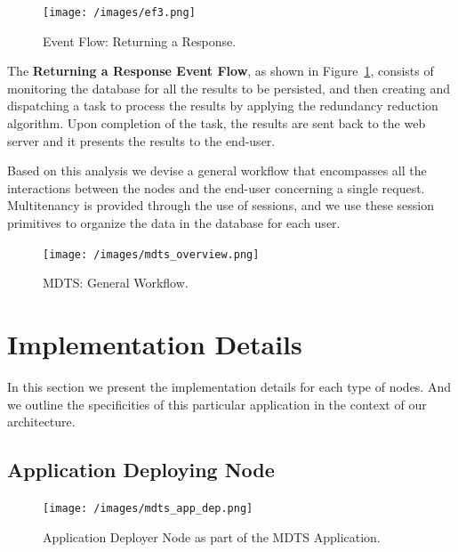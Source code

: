 \documentclass[12pt, titlepage]{uo_temp}
\begin{document}
     \begin{figure}
       \texttt{[image: /images/ef3.png]}
       \caption{Event Flow: Returning a Response.}
       \label{ef3}
     \end{figure}
     
     The \textbf{Returning a Response Event Flow}, as shown in Figure~\ref{ef3}, consists
     of monitoring the database for all the results to be persisted, and then creating and
     dispatching a task to process the results by applying the redundancy reduction
     algorithm. Upon completion of the task, the results are sent back to the web server
     and it presents the results to the end-user.
     
     Based on this analysis we devise a general workflow that encompasses all the
     interactions between the nodes and the end-user concerning a single
     request. Multitenancy is provided through the use of sessions, and we use these
     session primitives to organize the data in the database for each user.
     
     \begin{figure}
       \texttt{[image: /images/mdts\_overview.png]}
       \caption{MDTS: General Workflow.}
     \end{figure}

     
     \section{Implementation Details}
     In this section we present the implementation details for each type of nodes. And we
     outline the specificities of this particular application in the context of our
     architecture.

     \subsection{Application Deploying Node}
     \begin{figure}
       \texttt{[image: /images/mdts\_app\_dep.png]}
       \caption{Application Deployer Node as part of the MDTS Application.}
     \end{figure}
     
\end{document}
